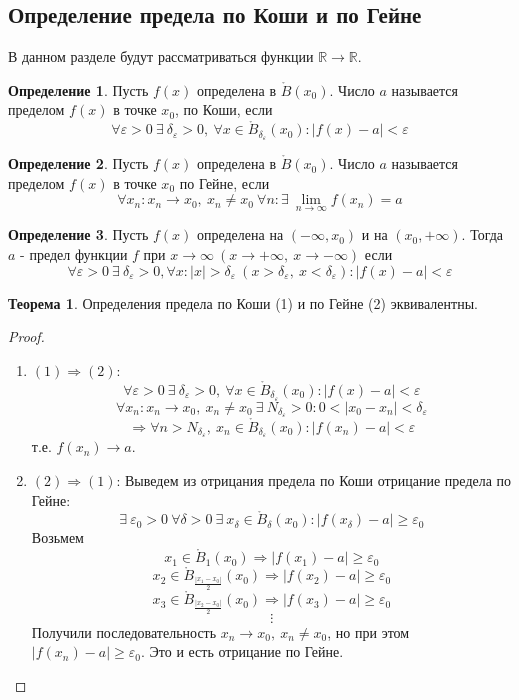 \documentclass[a4paper, 12pt]{article}
\newcommand{\R}{\mathbb{R}}
\newcommand{\Bo}{\mathring{B}}
\renewcommand{\epsilon}{\varepsilon}
\newcommand\tab[1][.5cm]{\hspace*{#1}}
\newcommand{\lims}{\lim\limits_{n\to \infty}}
\theoremstyle{definition}
\newtheorem*{definition}{Определение}
\newtheorem*{theorem}{Теорема}
\begin{document}
    \subsection{Определение предела по Коши и по Гейне}
        В данном разделе будут рассматриваться функции $\R\to\R$.
        \begin{definition}
            Пусть $f(x)$ определена в $\mathring{B}(x_0)$. Число $a$ называется пределом $f(x)$ в точке $x_0$, по Коши, если  
            \[\forall \epsilon>0\ \exists\ \delta_{\epsilon}>0,\ \forall x\in \Bo_{\delta_{\epsilon}}(x_0): |f(x)-a|<\epsilon\]
        \end{definition} 
        \begin{definition}
            Пусть $f(x)$ определена в $\Bo(x_0)$. Число $a$ называется пределом $f(x)$ в точке $x_0$ по Гейне, если
            \[\forall x_n: x_n\to x_0,\ x_n\ne x_0\ \forall n: \exists\ \lims f(x_n)=a\]
        \end{definition} 
        \begin{definition}
            Пусть $f(x)$ определена на $(-\infty, x_0)$ и на $(x_0, +\infty)$. Тогда \\
            $a$ - предел функции $f$ при $x\to \infty\ (x\to +\infty,\ x\to -\infty)$ если 
            \[\forall \epsilon>0\ \exists\ \delta_{\epsilon}>0, \forall x: |x|>\delta_{\epsilon}\ (x>\delta_{\epsilon},\ x<\delta_{\epsilon}): |f(x)-a|<\epsilon\]
        \end{definition} 
        \begin{theorem} 
            Определения предела по Коши (1) и по Гейне (2) эквивалентны.
        \end{theorem} 
        \begin{proof}\tab
            \begin{enumerate}
                \item $(1)\Rightarrow(2)$: 
                \[\forall \epsilon>0\ \exists\ \delta_{\epsilon}>0,\ \forall x\in \Bo_{\delta_{\epsilon}}(x_0): |f(x)-a|<\epsilon\]
                \[\forall x_n: x_n\to x_0,\ x_n\ne x_0\ \exists\ N_{\delta_{\epsilon}}>0: 0<|x_0-x_n|<\delta_{\epsilon}\]
                \[\Rightarrow \forall n> N_{\delta_{\epsilon}},\ x_n\in \Bo_{\delta_{\epsilon}}(x_0): |f(x_n)-a|<\epsilon\] т.е. $f(x_n)\to a$.
                \item $(2)\Rightarrow(1)$: Выведем из отрицания предела по Коши отрицание предела по Гейне: 
                \[\exists\ \epsilon_0> 0\ \forall \delta>0\ \exists\ x_{\delta}\in \Bo_{\delta}(x_0): |f(x_{\delta})-a|\geq \epsilon_0\]
                Возьмем 
                \[x_1 \in \Bo_1(x_0) \Rightarrow |f(x_1)-a|\geq \epsilon_0\] 
                \[x_2 \in \Bo_{\frac{|x_1-x_0|}{2}}(x_0) \Rightarrow |f(x_2)-a|\geq \epsilon_0\]
                \[x_3\in \Bo_{\frac{|x_2-x_0|}{2}}(x_0) \Rightarrow |f(x_3)-a|\geq \epsilon_0\]
                \[\vdots\]
                Получили последовательность $x_n\to x_0,\ x_n\ne x_0$, но при этом\\
                $|f(x_n)-a|\geq \epsilon_0$. Это и есть отрицание по Гейне.
            \end{enumerate}
        \end{proof} 
\end{document}
